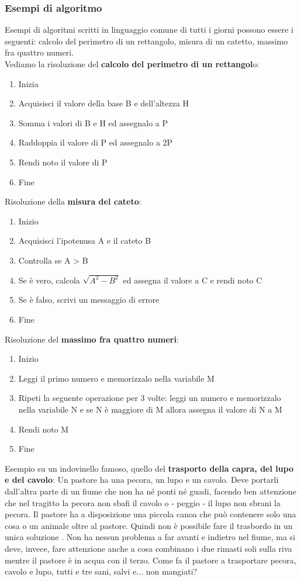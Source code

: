 \documentclass{article}
\begin{document}
	\subsubsection{Esempi di algoritmo}
	Esempi di algoritmi scritti in linguaggio comune di tutti i giorni possono essere i seguenti: calcolo del perimetro di un rettangolo, misura di un catetto, massimo fra quattro numeri.\\
	Vediamo la risoluzione del \textbf{calcolo del perimetro di un rettangol}o:
	\begin{enumerate}
		\item Inizia
		\item Acquisisci il valore della base B e dell'altezza H
		\item Somma i valori di B e H ed assegnalo a P
		\item Raddoppia il valore di P ed assegnalo a 2P
		\item Rendi noto il valore di P
		\item Fine
	\end{enumerate}
	Risoluzione della \textbf{misura del cateto}:
	\begin{enumerate}
		\item Inizio
		\item Acquisisci l'ipotenusa A e il cateto B
		\item Controlla se A > B
		\item Se è vero, calcola $\sqrt{A^{2} - B^{2}}$ ed assegna il valore a C e rendi noto C
		\item Se è falso, scrivi un messaggio di errore
		\item Fine
	\end{enumerate}
	Risoluzione del \textbf{massimo fra quattro numeri}:
	\begin{enumerate}
		\item Inizio
		\item Leggi il primo numero e memorizzalo nella variabile M
		\item Ripeti la seguente operazione per 3 volte: leggi un numero e memorizzalo nella variabile N e se N è maggiore di M allora assegna il valore di N a M
		\item Rendi noto M
		\item Fine
	\end{enumerate}
	Esempio su un indovinello famoso, quello del \textbf{trasporto della capra, del lupo e del cavolo}: Un pastore ha una pecora, un lupo e un cavolo. Deve portarli dall'altra parte di un fiume che non ha né ponti né guadi, facendo ben attenzione che nel tragitto la pecora non sbafi il cavolo o - peggio - il lupo non sbrani la pecora. Il pastore ha a disposizione una piccola canoa che può contenere solo una cosa o un animale oltre al pastore. Quindi non è possibile fare il trasbordo in un unica soluzione .  Non ha nessun problema a far avanti e indietro nel fiume, ma si deve, invece,  fare attenzione anche a cosa combinano i due rimasti soli sulla riva mentre il pastore è in acqua con il terzo. Come fa il pastore a trasportare pecora, cavolo e lupo, tutti e tre sani, salvi e... non mangiati?
\end{document}
